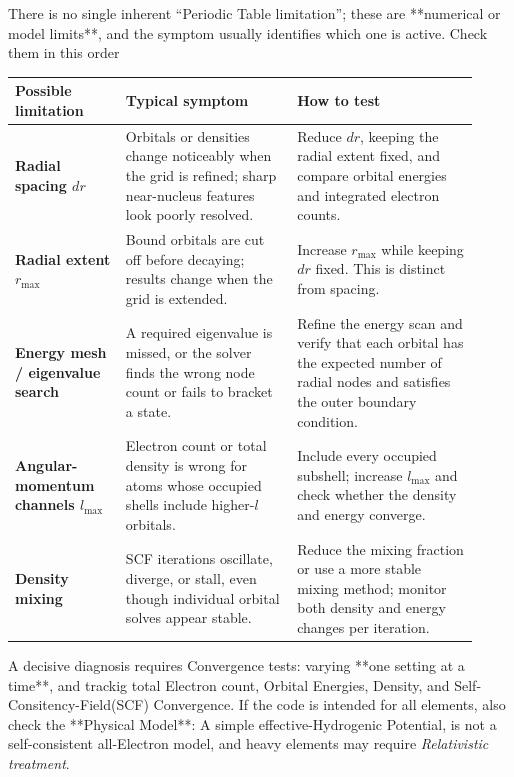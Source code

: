 \documentclass[a4paper, 10pt, onepage]{elegantbook}
\begin{document}
There is no single inherent “Periodic Table limitation”; these are **numerical or model limits**, and the symptom usually identifies which one is active. Check them in this order
\begin{table}[ht]
\centering
\begin{tabular}{p{0.22\linewidth} p{0.34\linewidth} p{0.36\linewidth}}
\hline
\textbf{Possible limitation} & \textbf{Typical symptom} & \textbf{How to test} \\
\hline
\textbf{Radial spacing \(dr\)} &
Orbitals or densities change noticeably when the grid is refined; sharp near-nucleus features look poorly resolved. &
Reduce \(dr\), keeping the radial extent fixed, and compare orbital energies and integrated electron counts. \\

\textbf{Radial extent \(r_{\max}\)} &
Bound orbitals are cut off before decaying; results change when the grid is extended. &
Increase \(r_{\max}\) while keeping \(dr\) fixed. This is distinct from spacing. \\

\textbf{Energy mesh / eigenvalue search} &
A required eigenvalue is missed, or the solver finds the wrong node count or fails to bracket a state. &
Refine the energy scan and verify that each orbital has the expected number of radial nodes and satisfies the outer boundary condition. \\

\textbf{Angular-momentum channels \(l_{\max}\)} &
Electron count or total density is wrong for atoms whose occupied shells include higher-\(l\) orbitals. &
Include every occupied subshell; increase \(l_{\max}\) and check whether the density and energy converge. \\

\textbf{Density mixing} &
SCF iterations oscillate, diverge, or stall, even though individual orbital solves appear stable. &
Reduce the mixing fraction or use a more stable mixing method; monitor both density and energy changes per iteration. \\
\hline
\end{tabular}
\end{table}

A decisive diagnosis requires Convergence tests: varying **one setting at a time**, and trackig total Electron count, Orbital Energies, Density, and Self-Consitency-Field(SCF) Convergence. If the code is intended for all elements, also check the **Physical Model**: A simple effective-Hydrogenic Potential, is not a self-consistent all-Electron model, and heavy elements may require \emph{Relativistic treatment}.
\end{document}
